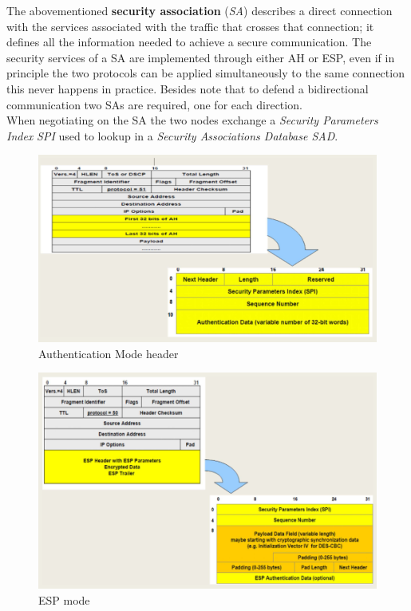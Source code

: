 The abovementioned \textbf{security association} (\textit{SA}) describes a direct connection with the
services associated with the traffic that crosses that connection;
it defines all the information needed to achieve a secure
communication.
The security services of a SA are implemented through either AH
or ESP, even if in principle the two protocols can be applied
simultaneously to the same connection this never happens in
practice.
Besides note that to defend a bidirectional communication two SAs are required,
one for each direction.\\
When negotiating on the SA the two nodes exchange a \textit{Security Parameters Index} \textit{SPI} used to lookup in a \textit{Security Associations Database SAD}.
\begin{figure}[htbp]
   \centering
   \includegraphics{images/IPSEC_ah.png}
   \caption{Authentication Mode header}
   \label{fig:IPSEC_ah}
\end{figure}
\begin{figure}[htbp]
   \centering
   \includegraphics{images/IPSEC_esp.png}
   \caption{ESP mode}
   \label{fig:IPSEC_ah}
\end{figure}
